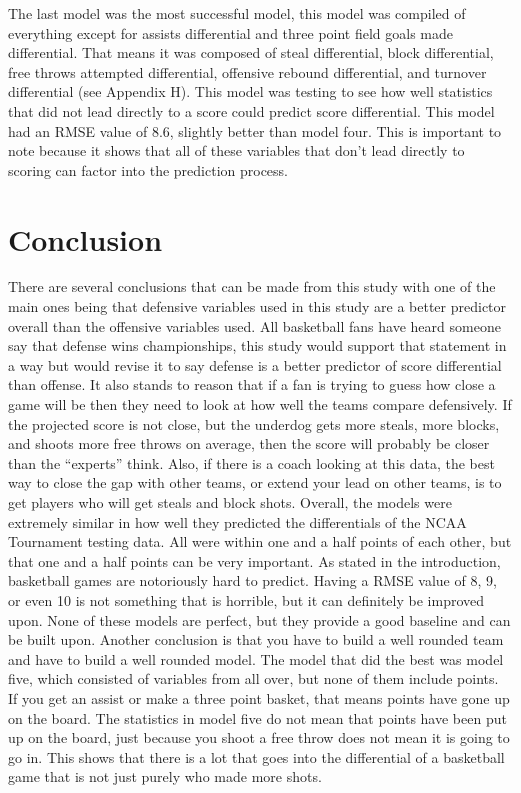 \documentclass{article}
\begin{document}
\newline \indent The last model was the most successful model, this model was compiled of everything except for assists differential and three point field goals made differential. That means it was composed of steal differential, block differential, free throws attempted differential, offensive rebound differential, and turnover differential (see Appendix H). This model was testing to see how well statistics that did not lead directly to a score could predict score differential. This model had an RMSE value of 8.6, slightly better than model four. This is important to note because it shows that all of these variables that don’t lead directly to scoring can factor into the prediction process. 
\section{Conclusion}
There are several conclusions that can be made from this study with one of the main ones being that defensive variables used in this study are a better predictor overall than the offensive variables used. All basketball fans have heard someone say that defense wins championships, this study would support that statement in a way but would revise it to say defense is a better predictor of score differential than offense. It also stands to reason that if a fan is trying to guess how close a game will be then they need to look at how well the teams compare defensively. If the projected score is not close, but the underdog gets more steals, more blocks, and shoots more free throws on average, then the score will probably be closer than the “experts” think. Also, if there is a coach looking at this data, the best way to close the gap with other teams, or extend your lead on other teams, is to get players who will get steals and block shots.
\newline \indent Overall, the models were extremely similar in how well they predicted the differentials of the NCAA Tournament testing data. All were within one and a half points of each other, but that one and a half points can be very important. As stated in the introduction, basketball games are notoriously hard to predict. Having a RMSE value of 8, 9, or even 10 is not something that is horrible, but it can definitely be improved upon. None of these models are perfect, but they provide a good baseline and can be built upon.
\newline \indent Another conclusion is that you have to build a well rounded team and have to build a well rounded model. The model that did the best was model five, which consisted of variables from all over, but none of them include points. If you get an assist or make a three point basket, that means points have gone up on the board. The statistics in model five do not mean that points have been put up on the board, just because you shoot a free throw does not mean it is going to go in. This shows that there is a lot that goes into the differential of a basketball game that is not just purely who made more shots.
\end{document}
